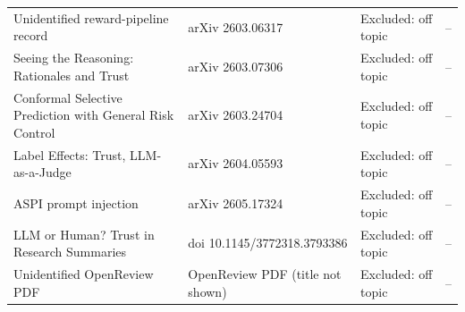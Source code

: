 \documentclass[acmsmall]{acmart}
\begin{document}
\begin{center}
\begin{longtable}{@{}p{5.6cm} p{3.6cm} p{2.4cm} p{0.9cm}@{}}
Unidentified reward-pipeline record & arXiv 2603.06317 & Excluded: off topic & -- \\
Seeing the Reasoning: Rationales and Trust & arXiv 2603.07306 & Excluded: off topic & -- \\
Conformal Selective Prediction with General Risk Control & arXiv 2603.24704 & Excluded: off topic & -- \\
Label Effects: Trust, LLM-as-a-Judge & arXiv 2604.05593 & Excluded: off topic & -- \\
ASPI prompt injection & arXiv 2605.17324 & Excluded: off topic & -- \\
LLM or Human? Trust in Research Summaries & doi 10.1145/3772318.3793386 & Excluded: off topic & -- \\
Unidentified OpenReview PDF & OpenReview PDF (title not shown) & Excluded: off topic & -- \\
\bottomrule
\end{longtable}
\end{center}
\end{document}
